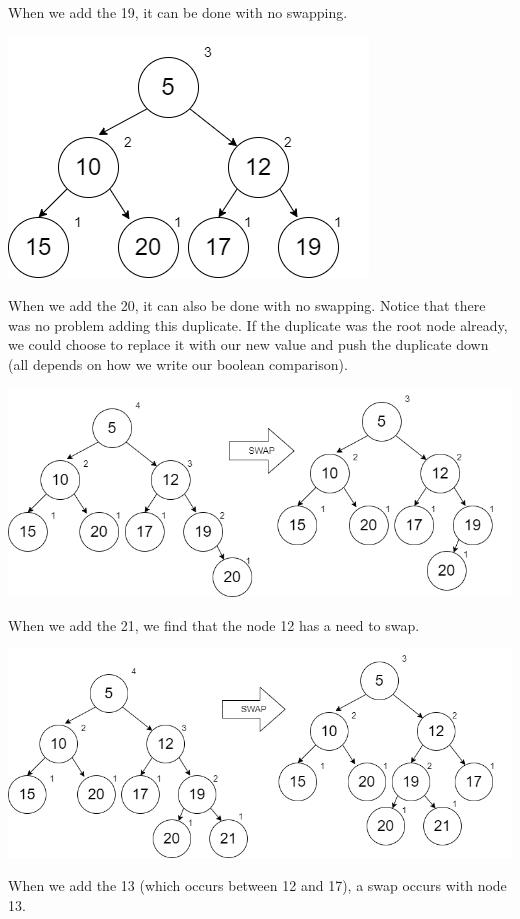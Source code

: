 \documentclass[
]{book}
\begin{document}
When we add the 19, it can be done with no swapping.

\includegraphics{images/heap8.drawio.png}

When we add the 20, it can also be done with no swapping. Notice that there was no problem adding this duplicate. If the duplicate was the root node already, we could choose to replace it with our new value and push the duplicate down (all depends on how we write our boolean comparison).

\includegraphics{images/heap9.drawio.png}

When we add the 21, we find that the node 12 has a need to swap.

\includegraphics{images/heap10.drawio.png}

When we add the 13 (which occurs between 12 and 17), a swap occurs with node 13.
\end{document}
